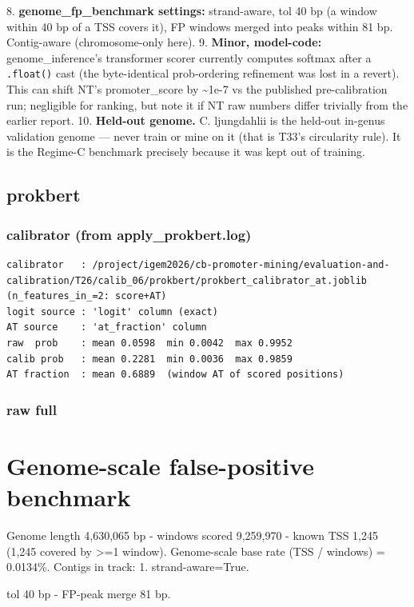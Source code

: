 \documentclass[10pt]{article}
\begin{document}
8. \textbf{genome\_fp\_benchmark settings:} strand-aware, tol 40 bp (a window within 40 bp of a TSS covers
it), FP windows merged into peaks within 81 bp. Contig-aware (chromosome-only here).
9. \textbf{Minor, model-code:} genome\_inference's transformer scorer currently computes softmax after a
\texttt{.float()} cast (the byte-identical prob-ordering refinement was lost in a revert). This can shift
NT's promoter\_score by \textasciitilde{}1e-7 vs the published pre-calibration run; negligible for ranking, but note
it if NT raw numbers differ trivially from the earlier report.
10. \textbf{Held-out genome.} C. ljungdahlii is the held-out in-genus validation genome --- never train or
mine on it (that is T33's circularity rule). It is the Regime-C benchmark precisely because it was
kept out of training.


\subsection*{prokbert}

\subsubsection*{calibrator (from apply\_prokbert.log)}
\begin{verbatim}
calibrator   : /project/igem2026/cb-promoter-mining/evaluation-and-calibration/T26/calib_06/prokbert/prokbert_calibrator_at.joblib  (n_features_in_=2: score+AT)
logit source : 'logit' column (exact)
AT source    : 'at_fraction' column
raw  prob    : mean 0.0598  min 0.0042  max 0.9952
calib prob   : mean 0.2281  min 0.0036  max 0.9859
AT fraction  : mean 0.6889  (window AT of scored positions)
\end{verbatim}

\subsubsection*{raw \textperiodcentered{} full}
\section*{Genome-scale false-positive benchmark}

Genome length 4,630,065 bp - windows scored 9,259,970 - known TSS 1,245 (1,245 covered by >=1 window). Genome-scale base rate (TSS / windows) = 0.0134\%. Contigs in track: 1. strand-aware=True.

tol 40 bp - FP-peak merge 81 bp.
\end{document}
